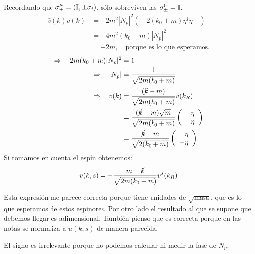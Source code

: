\par Recordando que $\sigma_\pm^\mu=(\mathbb I,\pm\sigma_i)$, sólo sobreviven las $\sigma_\pm^0=\mathbb I$.
\begin{equation}\begin{split}
\bar v(k)v(k)&=
-2m^2|N_p|^2
(\quad
2(k_0+m)\eta^\dagger\eta
\quad)\\
&=-4m^2(k_0+m)|N_p|^2\\
&=-2m,\quad\text{porque es lo que esperamos.}
\end{split}\end{equation}
\begin{equation}\begin{split}
\Rightarrow\quad2m(k_0+m)|N_p|^2&=1\\
\Rightarrow\quad|N_p|&=\frac1{\sqrt{2m(k_0+m)}}\\
\Rightarrow\quad v(k)&=\frac{(\ck-m)}{\sqrt{2m(k_0+m)}}v(k_R)\\
&=\frac{(\ck-m)\sqrt m}{\sqrt{2m(k_0+m)}}
\left(\begin{array}r\eta\\-\eta\end{array}\right)\\
&=\frac{\ck-m}{\sqrt{2(k_0+m)}}
\left(\begin{array}r\eta\\-\eta\end{array}\right)
\end{split}\end{equation}
Si tomamos en cuenta el espín obtenemos:
\begin{equation}
v(k,s)=-\frac{m-\cancel k}{\sqrt{2m(k_0+m)}}v^s(k_R)
\label{pera}
\end{equation}
\par Esta expresión me parece correcta porque tiene unidades de $\sqrt{\text{masa}}$, que es lo que esperamos de estos espinores. Por otro lado el resultado al que se supone que debemos llegar es adimensional. También pienso que es correcta porque en las notas se normaliza a $u(k,s)$ de manera parecida.
\par El signo es irrelevante porque no podemos calcular ni medir la fase de $N_p$.
